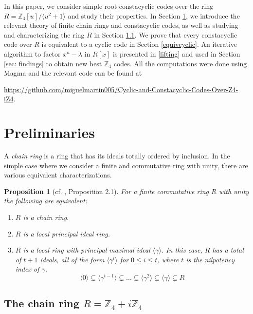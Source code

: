 \documentclass[a4paper, 12pt]{amsart}
\newtheorem{proposition}[lemma]{Proposition}
\theoremstyle{definition}
\newcommand{\Z}{{\mathbb Z}}
\newcommand{\lm}{\lambda}
\numberwithin{equation}{section}
\numberwithin{table}{section}
\begin{document}
In this paper, we consider simple root constacyclic codes over the ring $R=\Z_4[u]/\langle u^2+1 \rangle$ and study their properties. In Section \ref{prelims}, we introduce the relevant theory of finite chain rings and constacyclic codes, as well as studying and characterizing the ring $R$ in Section \ref{sec: ring R}. We prove that every constacyclic code over $R$ is equivalent to a cyclic code in Section \ref{equivcyclic}. An iterative algorithm to factor $x^n-\lm$ in $R[x]$ is presented in \ref{lifting} and used in Section \ref{sec: findings} to obtain new best $\Z_4$ codes. All the computations were done using Magma \cite{magma} and the relevant code can be found at 

\url{https://github.com/miguelmartin005/Cyclic-and-Constacyclic-Codes-Over-Z4-iZ4}{}.



\section{Preliminaries}\label{prelims}
A \emph{chain ring} is a ring that has its ideals totally ordered by inclusion. In the simple case where we consider a finite and commutative ring with unity, there are various equivalent characterizations.
\begin{proposition}[cf. \cite{Dinh}, Proposition 2.1]\label{charact}
    For a finite commutative ring $R$ with unity the following are equivalent:
    \begin{enumerate}
        \item $R$ is a chain ring.
        \item $R$ is a local principal ideal ring.
        \item $R$ is a local ring with principal maximal ideal $\langle \gamma \rangle$. In this case, $R$ has a total of $t+1$ ideals, all of the form $\langle \gamma ^i \rangle$ for $0 \leq i \leq t$, where $t$ is the nilpotency index of $\gamma $.
        \[\langle0 \rangle \subsetneq \langle \gamma ^{t-1} \rangle \subsetneq ... \subsetneq \langle \gamma ^2 \rangle \subsetneq \langle \gamma  \rangle \subsetneq R\]
    \end{enumerate}
\end{proposition}

\subsection{The chain ring $R =\Z_4+i\Z_4$}\label{sec: ring R}
\end{document}
